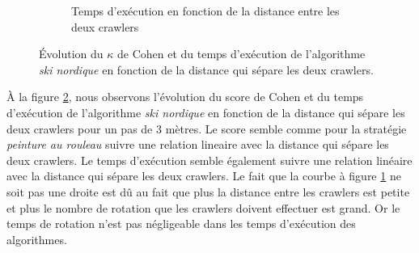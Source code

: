 \documentclass[francais,RandD]{rapportPFE}
\begin{document}
\begin{figure}[h!]
\begin{subfigure}[t]{0.49\linewidth}
						\caption{Temps d'exécution en fonction de la distance entre les deux crawlers}
						\label{fig:ski_nordique-time_vs_distance}
				\end{subfigure}
				\caption{Évolution du $\kappa$ de Cohen et du temps d'exécution de l'algorithme \textit{ski nordique} en fonction de la distance qui sépare les deux crawlers.}
				\label{fig:ski_nordique-distance}
			\end{figure}

			À la figure \ref{fig:ski_nordique-distance}, nous observons l'évolution du score de Cohen et du temps d'exécution de l'algorithme \textit{ski nordique} en fonction de la distance qui sépare les deux crawlers pour un pas de 3 mètres.
			Le score semble comme pour la stratégie \textit{peinture au rouleau} suivre une relation lineaire avec la distance qui sépare les deux crawlers.
			Le temps d'exécution semble également suivre une relation linéaire avec la distance qui sépare les deux crawlers.
			Le fait que la courbe à figure \ref{fig:ski_nordique-time_vs_distance} ne soit pas une droite est dû au fait que plus la distance entre les crawlers est petite et plus le nombre de rotation que les crawlers doivent effectuer est grand.
			Or le temps de rotation n'est pas négligeable dans les temps d'exécution des algorithmes.
\end{document}
